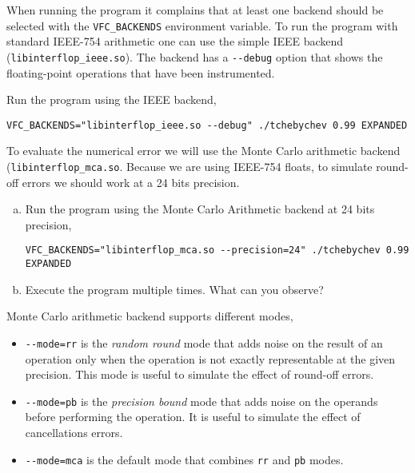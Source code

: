 When running the program it complains that at least one backend should be
selected with the \texttt{VFC\_BACKENDS} environment variable.
To run the program with standard IEEE-754 arithmetic one can use the simple
IEEE backend (\texttt{libinterflop\_ieee.so}). The backend has a \texttt{-{}-debug}
option that shows the floating-point operations that have been instrumented.

\begin{question}
Run the program using the IEEE backend,
\begin{verbatim}
VFC_BACKENDS="libinterflop_ieee.so --debug" ./tchebychev 0.99 EXPANDED
\end{verbatim}
\end{question}

To evaluate the numerical error we will use the Monte Carlo arithmetic backend
(\texttt{libinterflop\_mca.so}.  Because we are using IEEE-754 floats, to
simulate round-off errors we should work at a 24 bits precision.

\begin{question}
  \begin{enumerate}[(a)]
  \item Run the program using the Monte Carlo Arithmetic backend at 24 bits precision,
\begin{verbatim}
VFC_BACKENDS="libinterflop_mca.so --precision=24" ./tchebychev 0.99 EXPANDED
\end{verbatim}
  \item Execute the program multiple times. What can you observe?
  \end{enumerate}
\end{question}

Monte Carlo arithmetic backend supports different modes,
\begin{itemize}

  \item \texttt{-{}-mode=rr} is the \emph{random round} mode that adds noise on the
    result of an operation only when the operation is not exactly representable
    at the given precision. This mode is useful to simulate the effect of
    round-off errors.

  \item \texttt{-{}-mode=pb} is the \emph{precision bound} mode that adds noise on
  the operands before performing the operation. It is useful to simulate the
    effect of cancellations errors.

  \item \texttt{-{}-mode=mca} is the default mode that combines \texttt{rr} and
  \texttt{pb} modes.

\end{itemize}


